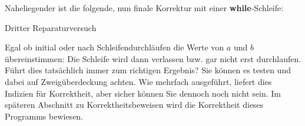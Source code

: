 \pagebreak %

Naheliegender ist die folgende, nun finale Korrektur mit einer \textbf{while}-Schleife:

\vspace{\baselineskip} %

\begin{algorithm}[H]
	\caption{Dritter Reparaturversuch}
	\label{algo:dritter_reparaturversuch}
	
	\vspace{\baselineskip}
	
	
	\vspace{\baselineskip}
	
	\;
	
	\vspace{\baselineskip} 
	
	
	\vspace{3mm}
\end{algorithm}

\vspace{\baselineskip} %

Egal ob initial oder nach Schleifendurchläufen die Werte von $a$ und $b$ übereinstimmen: Die Schleife wird dann verlassen bzw. gar nicht erst durchlaufen. Führt dies tatsächlich immer zum richtigen Ergebnis? Sie können es testen und dabei auf Zweigüberdeckung achten. Wie mehrfach ausgeführt, liefert dies Indizien für Korrektheit, aber sicher können Sie dennoch noch nicht sein. Im späteren Abschnitt zu Korrektheitsbeweisen wird die Korrektheit dieses Programms bewiesen.